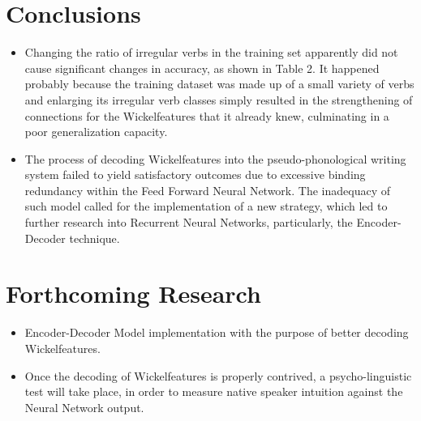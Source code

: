 \documentclass[a0,portrait]{a0poster}
\begin{document}
\begin{multicols}{2}

\color{DB} %

\section*{Conclusions}

\begin{itemize}
\color{darkgray}
\item \large Changing the ratio of irregular verbs in the training set apparently did not cause significant changes in accuracy, as shown in Table 2. It happened probably because the training dataset was made up of a small variety of verbs and enlarging its irregular verb classes simply resulted in the strengthening of connections for the Wickelfeatures that it already knew, culminating in a poor generalization capacity.
\item  \large The process of decoding Wickelfeatures into the pseudo-phonological writing system failed to yield satisfactory outcomes due to excessive binding redundancy within the Feed Forward Neural Network. The inadequacy of such model called for the implementation of a new strategy, which led to further research into Recurrent Neural Networks, particularly, the Encoder-Decoder technique. 
\end{itemize}

\color{darkgray} %

\color{DB}
\section*{Forthcoming Research}

\begin{itemize}
\color{darkgray}
\item \large Encoder-Decoder Model implementation with the purpose of better decoding Wickelfeatures.
\item \large Once the decoding of Wickelfeatures is properly contrived, a psycho-linguistic test will take place, in order to measure native speaker intuition against the Neural Network output.
\end{itemize}


\end{multicols}
\end{document}
